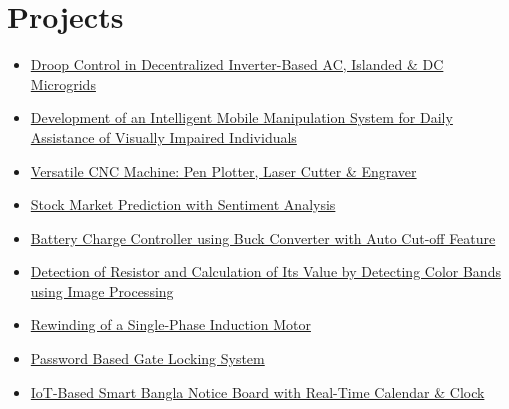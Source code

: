 \documentclass[a4paper,10pt]{article}
\newcommand{\project}[2]{\item \href{#2}{#1}~\href{#2}{\faGithub}}
\begin{document}
\pagestyle{empty}

\section{Projects}

\begin{itemize}[itemsep=3pt, topsep=2pt, leftmargin=1.2em, label=\textbullet]

  \project{Droop Control in Decentralized Inverter-Based AC, Islanded \& DC Microgrids}
          {https://github.com/Rifat137710/Droop-Control-in-Decentralized-Inverter-based-AC-Islanded-DC-Microgrid-}

  \project{Development of an Intelligent Mobile Manipulation System for Daily Assistance of Visually Impaired Individuals}
          {https://github.com/Rifat137710/Development-of-an-Intelligent-Mobile-Manipulation-System-}

  \project{Versatile CNC Machine: Pen Plotter, Laser Cutter \& Engraver}
          {https://github.com/Rifat137710/Versatile-CNC-Machine-Pen-plotter-Cutter-Engraver-}

  \project{Stock Market Prediction with Sentiment Analysis}
          {https://github.com/Rifat137710/Stock-Market-Prediction-with-Sentiment-Analysis}

  \project{Battery Charge Controller using Buck Converter with Auto Cut-off Feature}
          {https://github.com/Rifat137710/Battery-Charge-Controller-using-Buck-Converter-with-Auto-Cut-off-Feature-}

  \project{Detection of Resistor and Calculation of Its Value by Detecting Color Bands using Image Processing}
          {https://github.com/Rifat137710/Detection-Of-Resistor-and-Calculate-Its-Value-by-Detecting-color-band-using-Image-Processing-}

  \project{Rewinding of a Single-Phase Induction Motor}
          {https://github.com/Rifat137710/Rewinding-of-a-Single-Phase-Induction-Motor-}

  \project{Password Based Gate Locking System}
          {https://github.com/Rifat137710/Password-Based-Gate-Locking-System}

  \project{IoT-Based Smart Bangla Notice Board with Real-Time Calendar \& Clock}
          {https://github.com/Rifat137710/IoT-Based-Smart-Bangla-Notice-Board-with-Real-time-Calendar-Clock}

\end{itemize}
\end{document}
